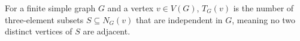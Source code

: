 \begin{definition}
For a finite simple graph $G$ and a vertex $v\in V(G)$, $T_G(v)$ is the
number of three-element subsets $S\subseteq N_G(v)$ that are independent in
$G$, meaning no two distinct vertices of $S$ are adjacent.
\end{definition}
